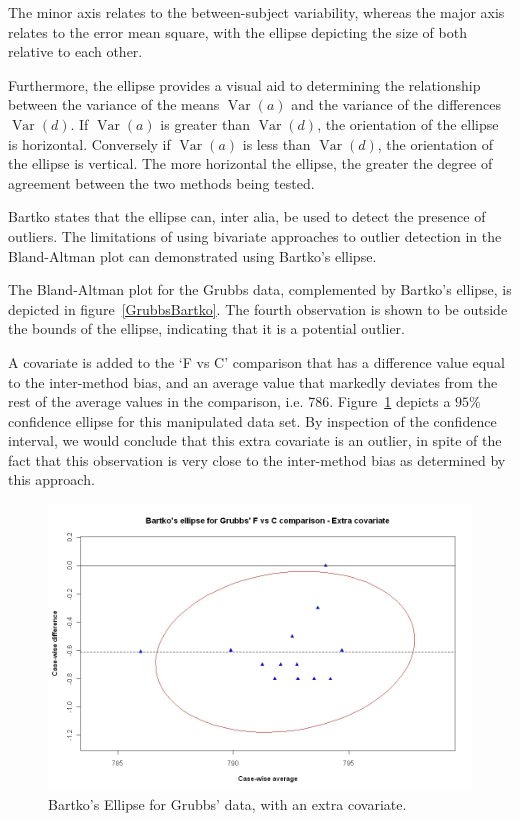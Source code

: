 \documentclass[12pt, a4paper]{report}
\theoremstyle{plain}
\theoremstyle{definition}
\theoremstyle{remark}
\begin{document}
The minor axis relates to the between-subject variability, whereas the major axis relates to the error mean square, with the ellipse depicting the size of both relative to each other.

Furthermore, the ellipse provides a visual aid to determining the relationship between the variance of the means $\operatorname{Var}(a)$ and the variance of the differences $\operatorname{Var}(d)$. If $\operatorname{Var}(a)$ is greater than $\operatorname{Var}(d)$, the orientation of the ellipse is horizontal. Conversely if $\operatorname{Var}(a)$ is less than $\operatorname{Var}(d)$, the orientation of the ellipse is vertical. The more horizontal the ellipse, the greater the degree of agreement between the two methods being tested.


Bartko states that the ellipse can, inter alia, be used to detect the presence of outliers. The limitations of using bivariate approaches to outlier detection in the Bland-Altman plot can demonstrated using Bartko's ellipse.


The Bland-Altman plot for the Grubbs data, complemented by Bartko's ellipse, is depicted in figure~\ref{GrubbsBartko}.
The fourth observation is shown to be outside the bounds of the ellipse, indicating that it is a potential outlier.

A covariate is added to the `F vs C' comparison that has a difference value equal to the inter-method bias, and an average value that markedly deviates from the rest of the average values
in the comparison, i.e. 786. Figure~\ref{GrubbsBartko2} depicts a $95\%$ confidence
ellipse for this manipulated data set. By inspection of the confidence interval, we would conclude that this extra covariate is an outlier, in spite of the fact that this observation is very close to the inter-method bias as determined by this approach.

\begin{figure}[h!]
	\includegraphics[width=130mm]{images/GrubbsBartko2.jpeg}
	\caption{Bartko's Ellipse for Grubbs' data, with an extra covariate.}\label{GrubbsBartko2}
\end{figure}
\end{document}
